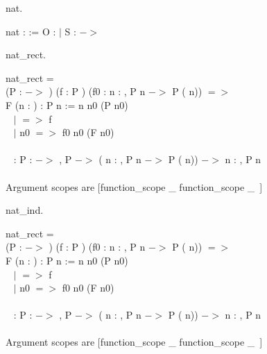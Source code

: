 \begin{code}	 nat.			\end{code}
\begin{msg}
	 nat :  :=  O :  $\mid$ S :  $->$ 
\end{msg}
\begin{code}	 nat\_rect.		\end{code}
\begin{msg}
	nat\_rect = 	\\
	 (P :  $->$ ) (f : P ) (f0 :  n : , P n $->$ P ( n)) $=>$	\\
	 F (n : ) : P n :=  n  n0  (P n0) 		\\ \-\ \qquad\qquad
			$\mid$  $=>$ f									\\ \-\ \qquad\qquad
			$\mid$  n0 $=>$ f0 n0 (F n0)							\\ \-\ \qquad\qquad
															\\ \-\ \qquad
		:  P :  $->$ , P  $->$ ( n : , P n 
			$->$ P ( n)) $->$  n : \nm{nat}, P n
	\\ \\
	Argument scopes are [function\_scope \_ function\_scope \_\ ]
\end{msg}
\begin{code}	 nat\_ind.		\end{code}
\begin{msg}
	nat\_rect = 	\\
	 (P :  $->$ ) (f : P ) (f0 :  n : , P n $->$ P ( n)) $=>$	\\
	 F (n : ) : P n :=  n  n0  (P n0) 		\\ \-\ \qquad\qquad
			$\mid$  $=>$ f									\\ \-\ \qquad\qquad
			$\mid$  n0 $=>$ f0 n0 (F n0)							\\ \-\ \qquad\qquad
															\\ \-\ \qquad
		:  P :  $->$ , P  $->$ ( n : , P n 
			$->$ P ( n)) $->$  n : , P n
	\\ \\
	Argument scopes are [function\_scope \_ function\_scope \_\ ]
\end{msg}
